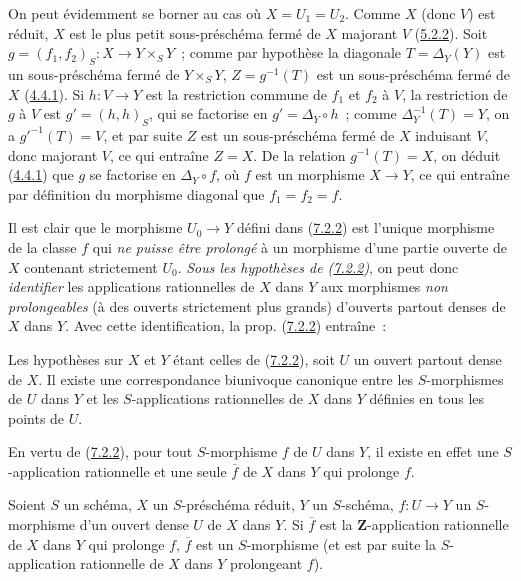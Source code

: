 On peut évidemment se borner au cas où $X=U_1=U_2$. Comme $X$ (donc $V$)
est réduit, $X$ est le plus petit sous-préschéma fermé de $X$ majorant $V$
(\hyperref[I.5.2.2-fr]{5.2.2}). Soit
$g=(f_1,f_2)_S:X\to Y\times_S Y$~; comme par hypothèse la diagonale
$T=\Delta_Y(Y)$ est un sous-préschéma fermé de $Y\times_S Y$,
$Z=g^{-1}(T)$ est un sous-préschéma fermé de $X$
(\hyperref[I.4.4.1-fr]{4.4.1}). Si $h:V\to Y$ est la restriction commune de
$f_1$ et $f_2$ à $V$, la restriction de $g$ à $V$ est $g'=(h,h)_S$, qui se
factorise en $g'=\Delta_Y\circ h$~; comme $\Delta_Y^{-1}(T)=Y$, on a
$g'^{-1}(T)=V$, et par suite $Z$ est un sous-préschéma fermé de $X$ induisant
$V$, donc majorant $V$, ce qui entraîne $Z=X$. De la relation
$g^{-1}(T)=X$, on déduit (\hyperref[I.4.4.1-fr]{4.4.1}) que $g$ se factorise
en $\Delta_Y\circ f$, où $f$ est un morphisme $X\to Y$, ce qui entraîne par
définition du morphisme diagonal que $f_1=f_2=f$.

Il est clair que le morphisme $U_0\to Y$ défini dans
(\hyperref[I.7.2.2-fr]{7.2.2}) est l'unique morphisme de la classe $f$ qui
\emph{ne puisse être prolongé} à un morphisme d'une partie ouverte de $X$
contenant strictement $U_0$. \emph{Sous les hypothèses de
(\hyperref[I.7.2.2-fr]{7.2.2})}, on peut donc \emph{identifier} les
applications rationnelles de $X$ dans $Y$ aux morphismes \emph{non
prolongeables} (à des ouverts strictement plus grands) d'ouverts partout
denses de $X$ dans $Y$. Avec cette identification, la prop.
(\hyperref[I.7.2.2-fr]{7.2.2}) entraîne~:

\begin{corollary}[7.2.3]
\label{I.7.2.3-fr}
Les hypothèses sur $X$ et $Y$ étant celles de
(\hyperref[I.7.2.2-fr]{7.2.2}), soit $U$ un ouvert partout dense de $X$. Il
existe une correspondance biunivoque canonique entre les $S$-morphismes de
$U$ dans $Y$ et les $S$-applications rationnelles de $X$ dans $Y$ définies
en tous les points de $U$.
\end{corollary}

En vertu de (\hyperref[I.7.2.2-fr]{7.2.2}), pour tout $S$-morphisme $f$ de
$U$ dans $Y$, il existe en effet une $S$-application rationnelle et une seule
$\overline f$ de $X$ dans $Y$ qui prolonge $f$.

\begin{corollary}[7.2.4]
\label{I.7.2.4-fr}
Soient $S$ un schéma, $X$ un $S$-préschéma réduit, $Y$ un $S$-schéma,
$f:U\to Y$ un $S$-morphisme d'un ouvert dense $U$ de $X$ dans $Y$. Si
$\overline f$ est la $\mathbf{Z}$-application rationnelle de $X$ dans $Y$ qui
prolonge $f$, $\overline f$ est un $S$-morphisme (et est par suite la
$S$-application rationnelle de $X$ dans $Y$ prolongeant $f$).
\end{corollary}

